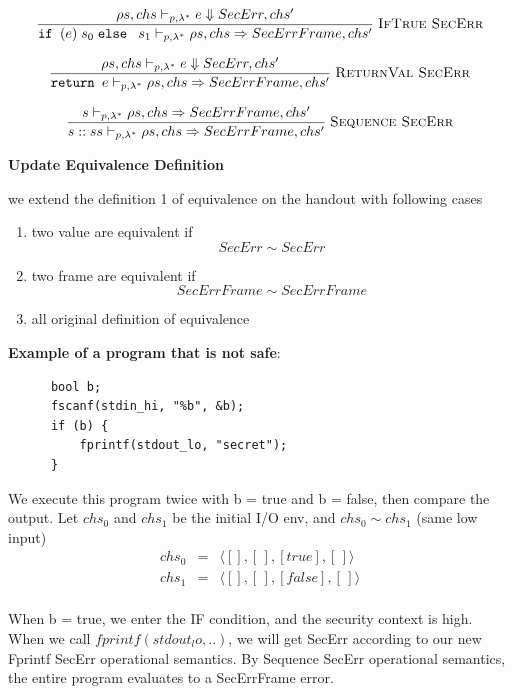 \documentclass[11pt]{article}
\begin{document}
\[
\frac{
  \rho s, chs \vdash_{p,\lambda^*} e \Downarrow SecErr, chs'
}{
  \texttt{if }(e)\; s_0\; \texttt{else }\; s_1
  \vdash_{p,\lambda^*}
  \rho s, chs
  \Rightarrow
  SecErrFrame, chs'
}
\;\textsc{IfTrue SecErr}
\]


\[
\frac{
  \rho s, chs \vdash_{p,\lambda^*} e \Downarrow SecErr, chs'
}{
  \texttt{return } e \vdash_{p,\lambda^*} \rho s, chs \Rightarrow SecErrFrame, chs'
}
\;\textsc{ReturnVal SecErr}
\]

\[
\frac{
  s \vdash_{p,\lambda^*} \rho s, chs \Rightarrow SecErrFrame, chs'
}{
  s :: ss \vdash_{p,\lambda^*} \rho s, chs \Rightarrow SecErrFrame, chs'
}
\;\textsc{Sequence SecErr}
\]

\newpage 
\textbf{Update Equivalence Definition}


we extend the definition 1 of equivalence on the handout with following cases
\begin{enumerate}
  \setcounter{enumi}{0}
  
  \item
  two value are equivalent if
  \[
  SecErr \sim SecErr
  \]
  
  \item
  two frame are equivalent if
  \[
  SecErrFrame \sim SecErrFrame
  \]

  \item 
  all original definition of equivalence
  \end{enumerate}


\textbf{Example of a program that is not safe}:
\begin{center}
    \begin{verbatim}
      bool b;
      fscanf(stdin_hi, "%b", &b);
      if (b) {
          fprintf(stdout_lo, "secret");
      }
    \end{verbatim}
\end{center}

We execute this program twice with b = true and b = false, then compare the output. Let $chs_0$ and $chs_1$ be the initial I/O env,
and $chs_0 \sim chs_1$ (same low input)
\[
  \begin{array}{rcl}
  chs_0 &=& \langle [], [\,], [true], [\,] \rangle \\[2mm]
  chs_1 &=& \langle [], [\,], [false], [\,] \rangle \\[2mm]
  \end{array}
  \]

When b = true, we enter the IF condition, and the security context is high. When we call $fprintf(stdout_lo,..)$, we will get SecErr according to our new Fprintf SecErr operational semantics.
By Sequence SecErr operational semantics, the entire program evaluates to a SecErrFrame error.
\end{document}
